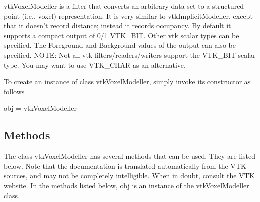vtk\-Voxel\-Modeller is a filter that converts an arbitrary data set to a structured point (i.\-e., voxel) representation. It is very similar to vtk\-Implicit\-Modeller, except that it doesn't record distance; instead it records occupancy. By default it supports a compact output of 0/1 V\-T\-K\-\_\-\-B\-I\-T. Other vtk scalar types can be specified. The Foreground and Background values of the output can also be specified. N\-O\-T\-E\-: Not all vtk filters/readers/writers support the V\-T\-K\-\_\-\-B\-I\-T scalar type. You may want to use V\-T\-K\-\_\-\-C\-H\-A\-R as an alternative.

To create an instance of class vtk\-Voxel\-Modeller, simply invoke its constructor as follows \begin{DoxyVerb}  obj = vtkVoxelModeller
\end{DoxyVerb}
 \hypertarget{vtkwidgets_vtkxyplotwidget_Methods}{}\subsection{Methods}\label{vtkwidgets_vtkxyplotwidget_Methods}
The class vtk\-Voxel\-Modeller has several methods that can be used. They are listed below. Note that the documentation is translated automatically from the V\-T\-K sources, and may not be completely intelligible. When in doubt, consult the V\-T\-K website. In the methods listed below, {\ttfamily obj} is an instance of the vtk\-Voxel\-Modeller class. 
